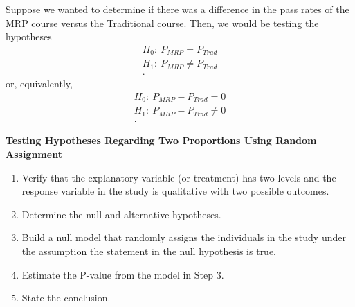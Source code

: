 \documentclass{report}
\begin{document}
    \pagebreak \bigbreak \noindent 
    Suppose we wanted to determine if there was a difference in the pass rates of the MRP course versus the Traditional course. Then, we would be testing the hypotheses
    \begin{align*}
        H_{0}:\ P_{MRP} = P_{Trad} \\
        H_{1}:\ P_{MRP} \ne P_{Trad} \\
    .\end{align*}
    \bigbreak \noindent 
    or, equivalently,
    \begin{align*}
        H_{0}:\ P_{MRP} - P_{Trad} = 0  \\
        H_{1}:\ P_{MRP} - P_{Trad} \ne 0  \\
    .\end{align*}

    \bigbreak \noindent \bigbreak \noindent 
    \textbf{Testing Hypotheses Regarding Two Proportions Using Random Assignment}
    \bigbreak \noindent 
    \begin{enumerate}
        \item Verify that the explanatory variable (or treatment) has two levels and the response variable in the study is qualitative with two possible outcomes.
        \item Determine the null and alternative hypotheses. 
        \item Build a null model that randomly assigns the individuals in the study under the assumption the statement in the null hypothesis is true.
        \item Estimate the P-value from the model in Step 3.
        \item State the conclusion.
    \end{enumerate}
\end{document}
